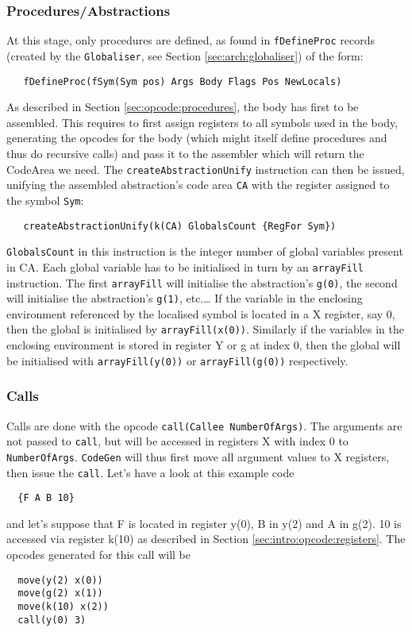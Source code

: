 \documentclass[a4paper]{memoir}
\begin{document}
\subsubsection{Procedures/Abstractions}\label{sec:codegen:procedures}
At this stage, only procedures are defined, as found in \lstinline!fDefineProc! records (created by the \lstinline!Globaliser!, see Section \ref{sec:arch:globaliser}) of the form:
\begin{lstlisting}
   fDefineProc(fSym(Sym pos) Args Body Flags Pos NewLocals)
\end{lstlisting}
As described in Section \ref{sec:opcode:procedures}, the body has first to be assembled. This requires to first assign registers to all symbols used in the body, generating the opcodes for the body (which might itself define procedures and thus do recursive calls) and pass it to the assembler which will return the CodeArea we need.
The \lstinline!createAbstractionUnify! instruction can then be issued, unifying the assembled abstraction's code area \lstinline!CA! with the register assigned to the symbol \lstinline!Sym!:
\begin{lstlisting}
   createAbstractionUnify(k(CA) GlobalsCount {RegFor Sym})
\end{lstlisting}
\lstinline!GlobalsCount! in this instruction is the integer number of global variables present in CA. Each global variable has to be initialised in turn by an \lstinline!arrayFill! instruction. The first \lstinline!arrayFill! will initialise the abstraction's \lstinline!g(0)!, the second will initialise the abstraction's \lstinline!g(1)!, etc.\ldots
If the variable in the enclosing environment referenced by the localised symbol
is located in a X register, say 0, then the global is initialised by
\lstinline!arrayFill(x(0))!. Similarly if the variables in the enclosing
environment is stored in register Y or g at index 0, then the global will be
initialised with \lstinline!arrayFill(y(0))! or \lstinline!arrayFill(g(0))! respectively.

\subsubsection{Calls}\label{sec:codegen:calls}
Calls are done with the opcode \lstinline!call(Callee NumberOfArgs)!. The arguments are not passed to \lstinline!call!, but will be accessed in registers X with index 0 to \lstinline!NumberOfArgs!. \lstinline!CodeGen! will thus first move all argument values to X registers, then issue the \lstinline!call!.
Let's have a look at this example code
\begin{lstlisting}
  {F A B 10}
\end{lstlisting}
and let's suppose that F is located in register y(0), B in y(2)  and A in g(2). 10 is accessed via register k(10) as described in Section \ref{sec:intro:opcode:registers}.
The opcodes generated for this call will be 
\begin{lstlisting}
  move(y(2) x(0))
  move(g(2) x(1))
  move(k(10) x(2))
  call(y(0) 3)
\end{lstlisting}
\end{document}
